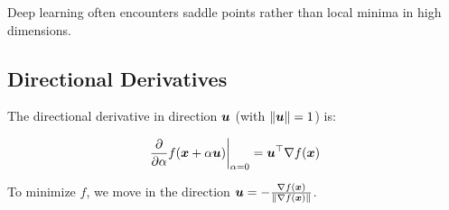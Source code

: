 Deep learning often encounters saddle points rather than local minima in high dimensions.

\subsection{Directional Derivatives}

The directional derivative in direction $\boldsymbol{u}$ (with $\|\boldsymbol{u}\| = 1$) is:

\begin{equation}
\frac{\partial}{\partial \alpha} f(\boldsymbol{x} + \alpha \boldsymbol{u}) \bigg|_{\alpha=0} = \boldsymbol{u}^\top \nabla f(\boldsymbol{x})
\end{equation}

To minimize $f$, we move in the direction $\boldsymbol{u} = -\frac{\nabla f(\boldsymbol{x})}{\|\nabla f(\boldsymbol{x})\|}$.
